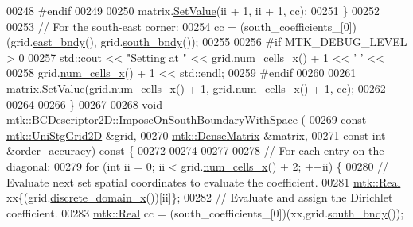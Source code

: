 \begin{DoxyCode}
00248 \textcolor{preprocessor}{    #endif}
00249 
00250     matrix.\hyperlink{classmtk_1_1DenseMatrix_a784ce5784109ac86bfb9d8562b334b13}{SetValue}(ii + 1, ii + 1, cc);
00251   \}
00252 
00253   \textcolor{comment}{// For the south-east corner:}
00254   cc = (south\_coefficients\_[0])(grid.\hyperlink{classmtk_1_1UniStgGrid2D_a03f689eb29a6369b82ce1207c655d5ff}{east\_bndy}(), grid.\hyperlink{classmtk_1_1UniStgGrid2D_a1442eaf219f099d0ebf46a170fdebf92}{south\_bndy}());
00255 
00256 \textcolor{preprocessor}{  #if MTK\_DEBUG\_LEVEL > 0}
00257   std::cout << \textcolor{stringliteral}{"Setting at "} << grid.\hyperlink{classmtk_1_1UniStgGrid2D_a2d182866a398aba8e4829590e85bf939}{num\_cells\_x}() + 1 << \textcolor{charliteral}{' '} <<
00258     grid.\hyperlink{classmtk_1_1UniStgGrid2D_a2d182866a398aba8e4829590e85bf939}{num\_cells\_x}() + 1 << std::endl;
00259 \textcolor{preprocessor}{  #endif}
00260 
00261   matrix.\hyperlink{classmtk_1_1DenseMatrix_a784ce5784109ac86bfb9d8562b334b13}{SetValue}(grid.\hyperlink{classmtk_1_1UniStgGrid2D_a2d182866a398aba8e4829590e85bf939}{num\_cells\_x}() + 1, grid.\hyperlink{classmtk_1_1UniStgGrid2D_a2d182866a398aba8e4829590e85bf939}{num\_cells\_x}() + 1, cc);
00262 
00264 
00266 \}
00267 
\hypertarget{mtk__bc__descriptor__2d_8cc_source_l00268}{}\hyperlink{classmtk_1_1BCDescriptor2D_af30c275cf06176a2ae9722014142c810}{00268} \textcolor{keywordtype}{void} \hyperlink{classmtk_1_1BCDescriptor2D_af30c275cf06176a2ae9722014142c810}{mtk::BCDescriptor2D::ImposeOnSouthBoundaryWithSpace}
      (
00269     \textcolor{keyword}{const} \hyperlink{classmtk_1_1UniStgGrid2D}{mtk::UniStgGrid2D} &grid,
00270     \hyperlink{classmtk_1_1DenseMatrix}{mtk::DenseMatrix} &matrix,
00271     \textcolor{keyword}{const} \textcolor{keywordtype}{int} &order\_accuracy)\textcolor{keyword}{ const }\{
00272 
00274 
00277 
00278   \textcolor{comment}{// For each entry on the diagonal:}
00279   \textcolor{keywordflow}{for} (\textcolor{keywordtype}{int} ii = 0; ii < grid.\hyperlink{classmtk_1_1UniStgGrid2D_a2d182866a398aba8e4829590e85bf939}{num\_cells\_x}() + 2; ++ii) \{
00280     \textcolor{comment}{// Evaluate next set spatial coordinates to evaluate the coefficient.}
00281     \hyperlink{group__c01-roots_gac080bbbf5cbb5502c9f00405f894857d}{mtk::Real} xx\{(grid.\hyperlink{classmtk_1_1UniStgGrid2D_ab2f70cf5cd0a2d5486992d9f2f8baa4a}{discrete\_domain\_x}())[ii]\};
00282     \textcolor{comment}{// Evaluate and assign the Dirichlet coefficient.}
00283     \hyperlink{group__c01-roots_gac080bbbf5cbb5502c9f00405f894857d}{mtk::Real} cc = (south\_coefficients\_[0])(xx,grid.\hyperlink{classmtk_1_1UniStgGrid2D_a1442eaf219f099d0ebf46a170fdebf92}{south\_bndy}());

\end{DoxyCode}
